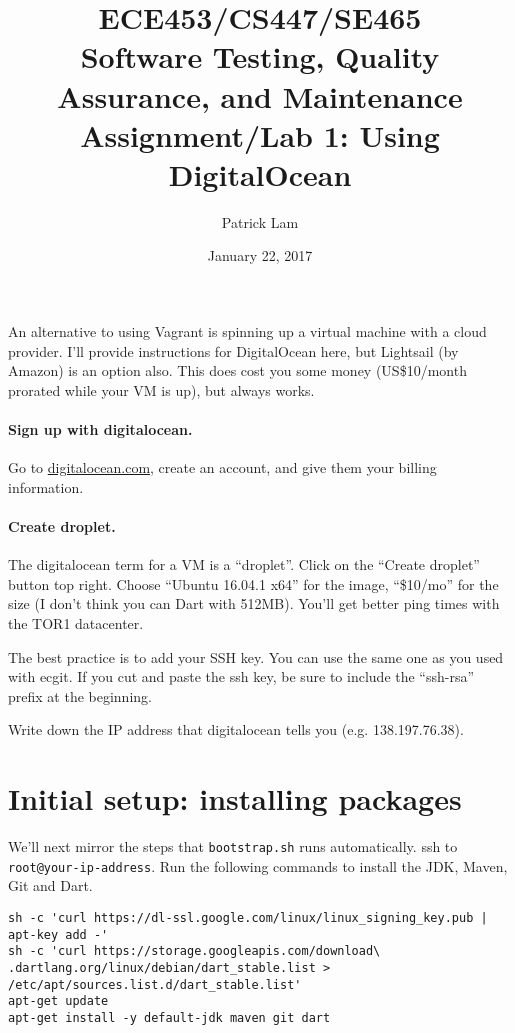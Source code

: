 \documentclass[10pt,hidelinks]{article}
\newcommand\textcode{\Verb}
\begin{document}
\title{
ECE453/CS447/SE465 \\
Software Testing, Quality Assurance, and Maintenance\\
Assignment/Lab 1: Using DigitalOcean}
\author{Patrick Lam}
\date{January 22, 2017}
\renewcommand{\today}{}
\maketitle

An alternative to using Vagrant is spinning up a virtual machine with a cloud provider.
I'll provide instructions for DigitalOcean here, but Lightsail (by Amazon) is an option also.
This does cost you some money (US\$10/month prorated while your VM is up), but always works.

\paragraph{Sign up with digitalocean.} Go to \url{digitalocean.com}, create an account, and give
them your billing information.

\paragraph{Create droplet.} The digitalocean term for a VM is a ``droplet''. Click on the
``Create droplet'' button top right. Choose ``Ubuntu 16.04.1 x64'' for the image, ``\$10/mo'' 
for the size (I don't think you can Dart with 512MB). You'll get better ping times with the
TOR1 datacenter.

The best practice is to add your SSH key. You can use the same one as you used with ecgit.
If you cut and paste the ssh key, be sure to include the ``ssh-rsa'' prefix at the beginning.


Write down the IP address that digitalocean tells you (e.g. 138.197.76.38).

\section*{Initial setup: installing packages}

We'll next mirror the steps that {\tt bootstrap.sh} runs automatically. ssh to {\tt root@your-ip-address}. Run the following commands to install the JDK, Maven, Git and Dart.

\textcode!sh -c 'curl https://dl-ssl.google.com/linux/linux_signing_key.pub | apt-key add -'!\\
\textcode!sh -c 'curl https://storage.googleapis.com/download\!\\
\textcode!.dartlang.org/linux/debian/dart_stable.list > /etc/apt/sources.list.d/dart_stable.list'!\\
\textcode!apt-get update!\\
\textcode!apt-get install -y default-jdk maven git dart!
\end{document}
